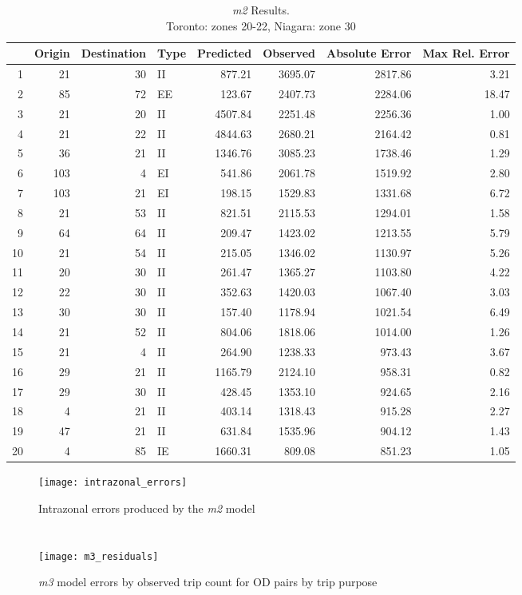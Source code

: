 \begin{table}[ht]
\caption{\textit{m2} Results. \\Toronto: zones 20-22, Niagara: zone 30}
\label{table:m2-error-table}
\centering
\begin{tabular}{rrrlrrrr}
  \toprule
 & Origin & Destination & Type & Predicted & Observed & Absolute Error & Max Rel. Error \\ 
  \midrule
1 & 21 & 30 & II & 877.21 & 3695.07 & 2817.86 & 3.21 \\ 
  2 & 85 & 72 & EE & 123.67 & 2407.73 & 2284.06 & 18.47 \\ 
  3 & 21 & 20 & II & 4507.84 & 2251.48 & 2256.36 & 1.00 \\ 
  4 & 21 & 22 & II & 4844.63 & 2680.21 & 2164.42 & 0.81 \\ 
  5 & 36 & 21 & II & 1346.76 & 3085.23 & 1738.46 & 1.29 \\ 
  6 & 103 & 4 & EI & 541.86 & 2061.78 & 1519.92 & 2.80 \\ 
  7 & 103 & 21 & EI & 198.15 & 1529.83 & 1331.68 & 6.72 \\ 
  8 & 21 & 53 & II & 821.51 & 2115.53 & 1294.01 & 1.58 \\ 
  9 & 64 & 64 & II & 209.47 & 1423.02 & 1213.55 & 5.79 \\ 
  10 & 21 & 54 & II & 215.05 & 1346.02 & 1130.97 & 5.26 \\ 
  11 & 20 & 30 & II & 261.47 & 1365.27 & 1103.80 & 4.22 \\ 
  12 & 22 & 30 & II & 352.63 & 1420.03 & 1067.40 & 3.03 \\ 
  13 & 30 & 30 & II & 157.40 & 1178.94 & 1021.54 & 6.49 \\ 
  14 & 21 & 52 & II & 804.06 & 1818.06 & 1014.00 & 1.26 \\ 
  15 & 21 & 4 & II & 264.90 & 1238.33 & 973.43 & 3.67 \\ 
  16 & 29 & 21 & II & 1165.79 & 2124.10 & 958.31 & 0.82 \\ 
  17 & 29 & 30 & II & 428.45 & 1353.10 & 924.65 & 2.16 \\ 
  18 & 4 & 21 & II & 403.14 & 1318.43 & 915.28 & 2.27 \\ 
  19 & 47 & 21 & II & 631.84 & 1535.96 & 904.12 & 1.43 \\ 
  20 & 4 & 85 & IE & 1660.31 & 809.08 & 851.23 & 1.05 \\ 
   \bottomrule
\end{tabular}
\end{table}

\begin{figure}[H]
\centering
\texttt{[image: intrazonal\_errors]}
\caption{Intrazonal errors produced by the \textit{m2} model}
\label{fig:m2-intrazonal}
\end{figure}

\chapter{}

\begin{figure}[H]
\centering
\texttt{[image: m3\_residuals]}
\caption{\textit{m3} model errors by observed trip count for OD pairs by trip purpose}
\label{fig:m3-residuals}
\end{figure}



